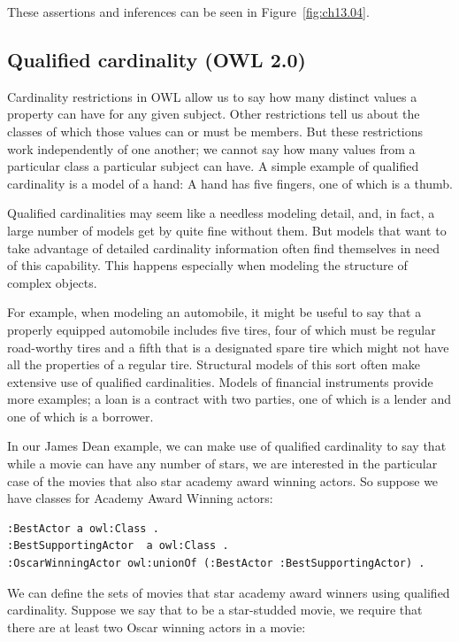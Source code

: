 These assertions and inferences can be seen in Figure~\ref{fig:ch13.04}.

\subsection{Qualified cardinality (OWL 2.0)}

Cardinality restrictions in OWL allow us to say how many distinct values
a property can have for any given subject. Other restrictions tell us
about the classes of which those values can or must be members. But
these restrictions work independently of one another; we cannot say how
many values from a particular class a particular subject can have. A
simple example of qualified cardinality is a model of a hand: A hand has
five fingers, one of which is a thumb.

Qualified cardinalities may seem like a needless modeling detail, and,
in fact, a large number of
models get by quite fine without them. But models that want to take
advantage of detailed cardinality information often find themselves in
need of this capability. This happens especially when modeling
the structure of complex objects.

For example, when modeling an automobile, it might be useful to say that
a properly equipped automobile includes five tires, four of which must
be regular road-worthy tires and a fifth that is a designated spare tire
which might not have all the properties of a regular tire. Structural
models of this sort often make extensive use of qualified cardinalities.
Models of financial instruments provide more examples; a loan is a contract
with two parties, one of which is a lender and one of which is a borrower. 


In our James Dean example, we can make use of qualified cardinality to
say that while a movie can have any number of stars, we are interested 
in the particular case of the movies that also star academy award winning
actors.  So suppose we have classes for Academy Award Winning actors:

\begin{lstlisting}
:BestActor a owl:Class .
:BestSupportingActor  a owl:Class .
:OscarWinningActor owl:unionOf (:BestActor :BestSupportingActor) .
\end{lstlisting}

We can define the sets of movies that star academy award
winners using qualified cardinality.  Suppose we say that to be a star-studded movie, 
we require that there are at least two Oscar winning actors in a movie:


